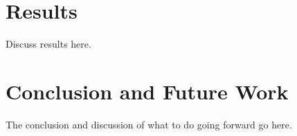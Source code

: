 \documentclass[conference]{IEEEtran}
\begin{document}


%
%
\section{Results}
Discuss results here.

\section{Conclusion and Future Work}
The conclusion and discussion of what to do
going forward go here.




%
\end{document}
